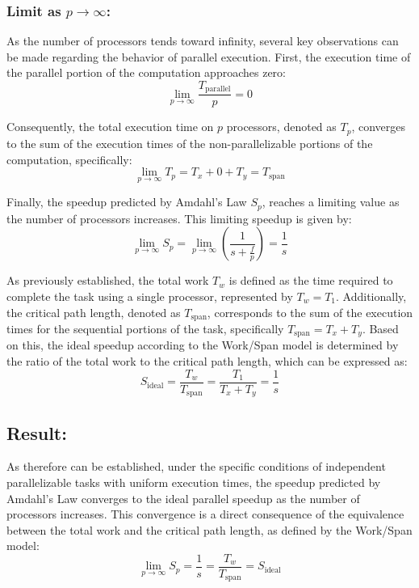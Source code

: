\documentclass[
  a4paper, %
]{kaohandt}
\begin{document}
\subsubsection*{Limit as $p \rightarrow \infty$:}

As the number of processors tends toward infinity, several key observations can be made regarding the behavior of parallel execution. First, the execution time of the parallel portion of the computation approaches zero:
\begin{equation}
  \lim_{p \to \infty} \frac{T_{\text{parallel}}}{p} = 0
\end{equation}

Consequently, the total execution time on $p$ processors, denoted as $T_p$, converges to the sum of the execution times of the non-parallelizable portions of the computation, specifically:
\begin{equation}
  \lim_{p \to \infty} T_p = T_x + 0 + T_y = T_{\text{span}}
\end{equation}

Finally, the speedup predicted by Amdahl's Law $S_p$, reaches a limiting value as the number of processors increases. This limiting speedup is given by:
\begin{equation}
  \lim_{p \to \infty} S_p = \lim_{p \to \infty} \left(\frac{1}{s + \frac{f}{p}}\right) = \frac{1}{s}
\end{equation}

As previously established, the total work $T_w$ is defined as the time required to complete the task using a single processor, represented by $T_w = T_1$. Additionally, the critical path length, denoted as $T_{\text{span}}$, corresponds to the sum of the execution times for the sequential portions of the task, specifically $T_{\text{span}} = T_x + T_y$. Based on this, the ideal speedup according to the Work/Span model is determined by the ratio of the total work to the critical path length, which can be expressed as:
\begin{equation}
  S_{\text{ideal}} = \frac{T_w}{T_{\text{span}}} = \frac{T_1}{T_x + T_y} = \frac{1}{s}
\end{equation}

\subsection*{Result:}

As therefore can be established, under the specific conditions of independent parallelizable tasks with uniform execution times, the speedup predicted by Amdahl's Law converges to the ideal parallel speedup as the number of processors increases. This convergence is a direct consequence of the equivalence between the total work and the critical path length, as defined by the Work/Span model:
\begin{equation}
  \lim_{p \to \infty} S_p = \frac{1}{s} = \frac{T_w}{T_{\text{span}}} = S_{\text{ideal}}
\end{equation}
\end{document}
